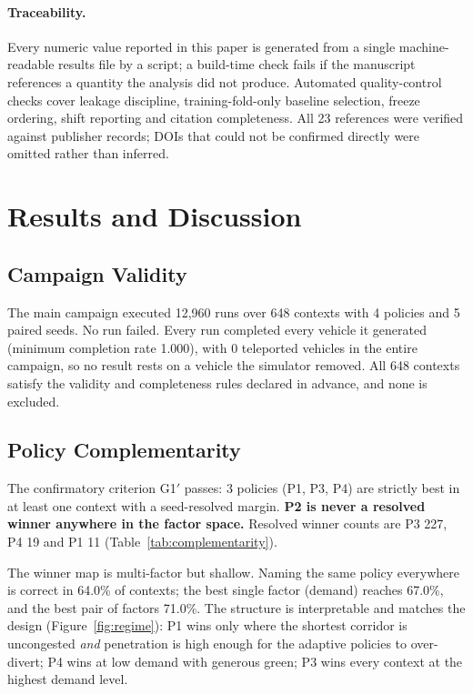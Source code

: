 \documentclass[runningheads]{llncs}
\begin{document}
\paragraph{Traceability.} Every numeric value reported in this paper is
generated from a single machine-readable results file by a script; a build-time
check fails if the manuscript references a quantity the analysis did not
produce. Automated quality-control checks cover leakage discipline,
training-fold-only baseline selection, freeze ordering, shift reporting and
citation completeness. All 23 references were verified against publisher
records; DOIs that could not be confirmed directly were omitted rather than
inferred.

\section{Results and Discussion}
\label{sec:results}

\subsection{Campaign Validity}

The main campaign executed 12{,}960 runs over 648 contexts with
4 policies and 5 paired seeds. No run failed. Every run
completed every vehicle it generated (minimum completion rate
1.000), with 0 teleported vehicles in the entire
campaign, so no result rests on a vehicle the simulator removed. All
648 contexts satisfy the validity and completeness rules
declared in advance, and none is excluded.

\subsection{Policy Complementarity}
\label{sec:complementarity}

The confirmatory criterion G1$'$ passes: 3 policies
(P1, P3, P4) are strictly best in at least one context with a
seed-resolved margin. \textbf{P2 is never a resolved winner anywhere in the
factor space.} Resolved winner counts are P3 227, P4
19 and P1 11 (Table~\ref{tab:complementarity}).

The winner map is multi-factor but shallow. Naming the same policy everywhere is
correct in 64.0\% of contexts; the best single factor
(demand) reaches 67.0\%, and the best pair of factors
71.0\%. The structure is interpretable and matches the design
(Figure~\ref{fig:regime}): P1 wins only where the shortest corridor is
uncongested \emph{and} penetration is high enough for the adaptive policies to
over-divert; P4 wins at low demand with generous green; P3 wins every context
at the highest demand level.
\end{document}
